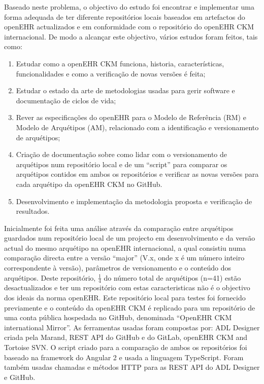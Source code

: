 \documentclass[mim_thesis.tex]{subfiles}
\begin{document}
Baseado neste problema, o objectivo do estudo foi encontrar e implementar uma forma adequada de ter diferente repositórios locais baseados em artefactos do openEHR actualizados e em conformidade com o repositório do openEHR CKM internacional. De modo a alcançar este objectivo, vários estudos foram feitos, tais como:
\begin{enumerate} [noitemsep]
\item Estudar como a openEHR CKM funciona, historia, características, funcionalidades e como a verificação de novas versões é feita;
\item Estudar o estado da arte de metodologias usadas para gerir software e documentação de ciclos de vida;
\item Rever as especificações do openEHR para o Modelo de Referência (RM) e Modelo de Arquétipos (AM), relacionado com a identificação e versionamento de arquétipos;
\item Criação de documentação sobre como lidar com o versionamento de arquétipos num repositório local e de um “script” para comparar os arquétipos contidos em ambos os repositórios e verificar as novas versões para cada arquétipo da openEHR CKM no GitHub.
\item Desenvolvimento e implementação da metodologia proposta e verificação de resultados.
\end{enumerate}

Inicialmente foi feita uma análise através da comparação entre arquétipos guardados num repositório local de um projecto em desenvolvimento e da versão actual do mesmo arquétipo na openEHR internacional, a qual consistiu numa comparação directa entre a versão “major” (V.x, onde x é um número inteiro correspondente à versão), parâmetros de versionamento e o conteúdo dos arquétipos. Deste repositório, \( \frac{1}{4} \) do número total de arquétipos (n=41) estão desactualizados e ter um repositório com estas caracteristicas não é o objectivo dos ideais da norma openEHR. Este repositório local para testes foi fornecido previamente e o conteúdo da openEHR CKM é replicado para um repositório de uma conta pública hospedada no GitHub, denominada “OpenEHR CKM international Mirror”. As ferramentas usadas foram compostas por: ADL Designer criada pela Marand, REST API do GitHub e do GitLab, openEHR CKM and Tortoise SVN. O script criado para a comparação de ambos os repositórios foi baseado na framework do Angular 2 e usada a linguagem TypeScript. Foram também usadas chamadas e métodos HTTP para as REST API do ADL Designer e GitHub.
\end{document}
